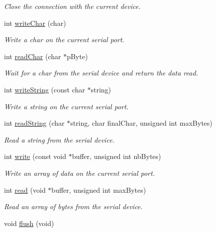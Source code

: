 \begin{DoxyCompactItemize}
\begin{DoxyCompactList}\small\item\em Close the connection with the current device. \end{DoxyCompactList}\item 
int \hyperlink{class_lib_serial_aace55a1a3fbf452728e00fc5ee7afafd}{write\+Char} (char)
\begin{DoxyCompactList}\small\item\em Write a char on the current serial port. \end{DoxyCompactList}\item 
int \hyperlink{class_lib_serial_a0999084a8ac1d5304dff5733c500a93d}{read\+Char} (char $\ast$p\+Byte)
\begin{DoxyCompactList}\small\item\em Wait for a char from the serial device and return the data read. \end{DoxyCompactList}\item 
int \hyperlink{class_lib_serial_a113ef8fcfd06b7b46a4a7c8a059dfa4d}{write\+String} (const char $\ast$string)
\begin{DoxyCompactList}\small\item\em Write a string on the current serial port. \end{DoxyCompactList}\item 
int \hyperlink{class_lib_serial_aa958f3032eb7036ae221d7e5d021df67}{read\+String} (char $\ast$string, char final\+Char, unsigned int max\+Bytes)
\begin{DoxyCompactList}\small\item\em Read a string from the serial device. \end{DoxyCompactList}\item 
int \hyperlink{class_lib_serial_a3dc028d5d297b832da5b7e681facd83c}{write} (const void $\ast$buffer, unsigned int nb\+Bytes)
\begin{DoxyCompactList}\small\item\em Write an array of data on the current serial port. \end{DoxyCompactList}\item 
int \hyperlink{class_lib_serial_ad2fb4e4927715b83de41d12fa4e2f329}{read} (void $\ast$buffer, unsigned int max\+Bytes)
\begin{DoxyCompactList}\small\item\em Read an array of bytes from the serial device. \end{DoxyCompactList}\item 
void \hyperlink{class_lib_serial_a71ea44ca686ce86e73d4f5ffcce36266}{flush} (void)\hypertarget{class_lib_serial_a71ea44ca686ce86e73d4f5ffcce36266}{}\label{class_lib_serial_a71ea44ca686ce86e73d4f5ffcce36266}


\end{DoxyCompactItemize}
